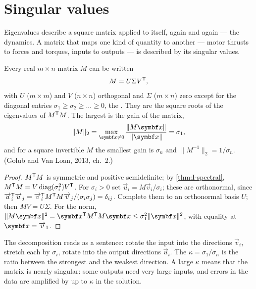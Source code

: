 \section{Singular values}

Eigenvalues describe a square matrix applied to itself, again and again — the dynamics. A matrix that maps one kind of quantity to another — motor thrusts to forces and torques, inputs to outputs — is described by its singular values.

\begin{theorem}
\label{thm:I-svd}
Every real $m \times n$ matrix $M$ can be written
\begin{equation}\label{eq:I-svd}
  M = U\Sigma V^{\mathsf{T}} ,
\end{equation}
with $U$ ($m \times m$) and $V$ ($n \times n$) orthogonal and $\Sigma$ ($m \times n$) zero except for the diagonal entries $\sigma_1 \ge \sigma_2 \ge \dots \ge 0$, the . They are the square roots of the eigenvalues of $M^{\mathsf{T}} M$. The largest is the gain of the matrix,
\begin{equation}\label{eq:I-norm}
  \|M\|_2 = \max_{\vx \ne 0}\frac{\|M\vx\|}{\|\vx\|} = \sigma_1 ,
\end{equation}
and for a square invertible $M$ the smallest gain is $\sigma_n$ and $\|M^{-1}\|_2 = 1/\sigma_n$. (Golub and Van Loan, 2013, ch.~2.)
\end{theorem}
\begin{proof}
$M^{\mathsf{T}} M$ is symmetric and positive semidefinite; by \cref{thm:I-spectral}, $M^{\mathsf{T}} M = V\operatorname{diag}(\sigma_i^2)V^{\mathsf{T}}$. For $\sigma_i > 0$ set $\vec u_i = M\vec v_i/\sigma_i$; these are orthonormal, since $\overrightarrow{u}_i^{\mathsf{T}}\overrightarrow{u}_j = \overrightarrow{v}_i^{\mathsf{T}} M^{\mathsf{T}} M\overrightarrow{v}_j/(\sigma_i\sigma_j) = \delta_{ij}$. Complete them to an orthonormal basis $U$; then $MV = U\Sigma$. For the norm, $\|M\vx\|^2 = \vx^\T M^\T M\vx \le \sigma_1^2\|\vx\|^2$, with equality at $\vx = \vec v_1$.
\end{proof}

The decomposition reads as a sentence: rotate the input into the directions $\vec v_i$, stretch each by $\sigma_i$, rotate into the output directions $\vec u_i$. The  $\kappa = \sigma_1/\sigma_n$ is the ratio between the strongest and the weakest direction. A large $\kappa$ means that the matrix is nearly singular: some outputs need very large inputs, and errors in the data are amplified by up to $\kappa$ in the solution.

